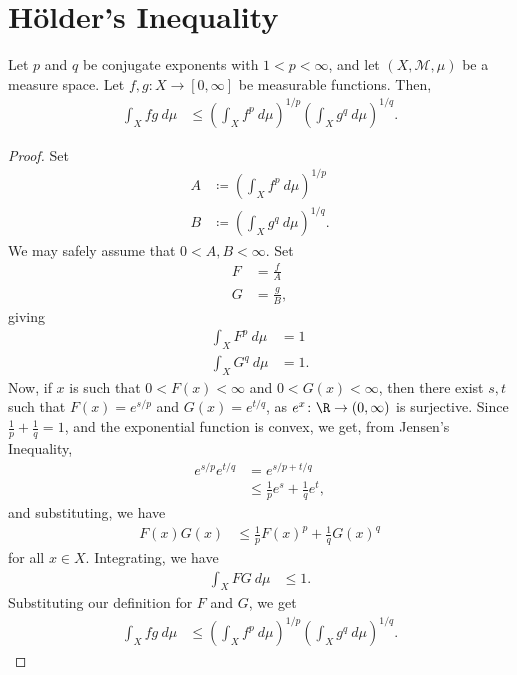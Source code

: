 \documentclass[10pt]{mypackage}
\begin{document}
\section{Hölder's Inequality}%
\begin{theorem}
  Let $p$ and $q$ be conjugate exponents with $1 < p < \infty$, and let $\left( X,\mathcal{M},\mu \right)$ be a measure space. Let $f,g\colon X\rightarrow [0,\infty]$ be measurable functions. Then,
  \begin{align*}
    \int_{X}^{} fg\:d\mu &\leq \left( \int_{ X }^{} f^{p}\:d\mu \right)^{1/p}\left( \int_{X}^{} g^{q}\:d\mu \right)^{1/q}.
  \end{align*}
\end{theorem}
\begin{proof}
  Set
  \begin{align*}
    A &\coloneq \left( \int_{X}^{} f^{p}\:d\mu \right)^{1/p}\\
    B &\coloneq \left( \int_{X}^{} g^{q}\:d\mu \right)^{1/q}.
  \end{align*}
  We may safely assume that $0 < A,B < \infty$. Set
  \begin{align*}
    F &= \frac{f}{A}\\
    G &= \frac{g}{B},
  \end{align*}
  giving
  \begin{align*}
    \int_{X}^{} F^{p}\:d\mu &= 1\\
    \int_{X}^{} G^{q}\:d\mu &= 1.
  \end{align*}
  Now, if $x$ is such that $0 < F(x) < \infty$ and $0 < G(x) < \infty$, then there exist $s,t$ such that $F(x) = e^{s/p}$ and $G(x) = e^{t/q}$, as $e^{x}\colon \R\rightarrow (0,\infty)$ is surjective. Since $\frac{1}{p} + \frac{1}{q} = 1$, and the exponential function is convex, we get, from Jensen's Inequality,
  \begin{align*}
    e^{s/p}e^{t/q} &= e^{s/p + t/q}\\
                   &\leq \frac{1}{p}e^{s} + \frac{1}{q}e^{t},
  \end{align*}
  and substituting, we have
  \begin{align*}
    F(x)G(x) &\leq \frac{1}{p}F(x)^{p} + \frac{1}{q}G(x)^{q}
  \end{align*}
  for all $x\in X$. Integrating, we have
  \begin{align*}
    \int_{X}^{} FG\:d\mu &\leq 1.
  \end{align*}
  Substituting our definition for $F$ and $G$, we get
  \begin{align*}
    \int_{X}^{} fg\:d\mu &\leq \left( \int_{X}^{} f^p\:d\mu \right)^{1/p} \left( \int_{X}^{} g^{q}\:d\mu \right)^{1/q}.
  \end{align*}
\end{proof}
\end{document}
